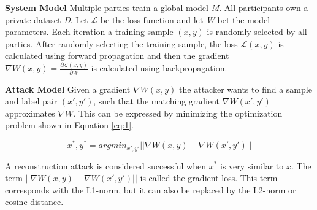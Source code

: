 \textbf{System Model}
Multiple parties train a global model \textit{M}. All participants own a private dataset \textit{D}. Let $\mathcal{L}$ be the loss function and let \textit{W} bet the model parameters. Each iteration a training sample $(x,y)$ is randomly selected by all parties. After randomly selecting the training sample, the loss $\mathcal{L}(x,y)$ is calculated using forward propagation and then the gradient $\nabla W(x,y) = \frac{\partial \mathcal{L}(x,y)}{\partial W}$ is calculated using backpropagation.


\textbf{Attack Model}
Given a gradient $\nabla W(x,y)$ the attacker wants to find a sample and label pair $(x',y')$, such that the matching gradient $\nabla W(x',y')$ approximates $\nabla W$. This can be expressed by minimizing the optimization problem shown in Equation \ref{eq:1}.

\begin{equation}
\label{eq:1}
x^*,y^* = argmin_{x',y'} ||\nabla W(x,y) - \nabla W(x',y')||
\end{equation}

A reconstruction attack is considered successful when $x^*$ is very similar to $x$. The term $||\nabla W(x,y) - \nabla W(x',y')||$ is called the gradient loss. This term corresponds with the L1-norm, but it can also be replaced by the L2-norm or cosine distance.

